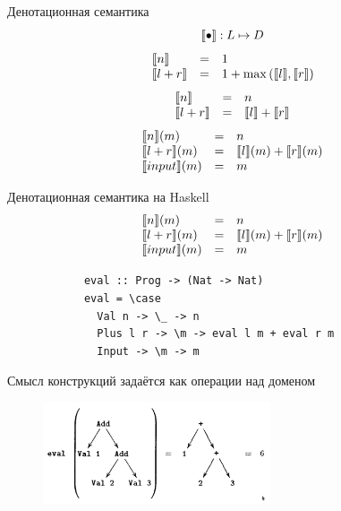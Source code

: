     \begin{frame}[fragile]{Денотационная семантика}
        \pause
        \[
            \llbracket{\bullet}\rrbracket : L \mapsto D
        \]
        \pause
        \[
            \begin{array}{lcl}
                \llbracket{n}\rrbracket     & = & 1                            \\
                \llbracket{l + r}\rrbracket & = & 1 + \max{(\llbracket{l}\rrbracket, \llbracket{r}\rrbracket)}
            \end{array}
        \]
        \pause
        \[
            \begin{array}{lcl}
                \llbracket{n}\rrbracket     & = & n                     \\
                \llbracket{l + r}\rrbracket & = & \llbracket{l}\rrbracket + \llbracket{r}\rrbracket
            \end{array}
        \]
        \pause
        \[
            \begin{array}{lcl}
                \llbracket{n}\rrbracket(m)     & = & n                           \\
                \llbracket{l + r}\rrbracket(m) & = & \llbracket{l}\rrbracket(m) + \llbracket{r}\rrbracket(m) \\
                \llbracket{input}\rrbracket(m) & = & m
            \end{array}
        \]
    \end{frame}

    \begin{frame}[fragile]{Денотационная семантика на Haskell}
        \pause
        \[
            \begin{array}{lcl}
                \llbracket{n}\rrbracket(m)     & = & n                           \\
                \llbracket{l + r}\rrbracket(m) & = & \llbracket{l}\rrbracket(m) + \llbracket{r}\rrbracket(m) \\
                \llbracket{input}\rrbracket(m) & = & m
            \end{array}
        \]
        \pause
        \begin{verbatim}
            eval :: Prog -> (Nat -> Nat)
            eval = \case
              Val n -> \_ -> n
              Plus l r -> \m -> eval l m + eval r m
              Input -> \m -> m
        \end{verbatim}
    \end{frame}

    \begin{frame}[fragile]{Смысл конструкций задаётся как операции над доменом}
        \begin{figure}[h]
            \centering
            \includegraphics[width=0.6\textwidth]{figs/eval-prog}
        \end{figure}
    \end{frame}

